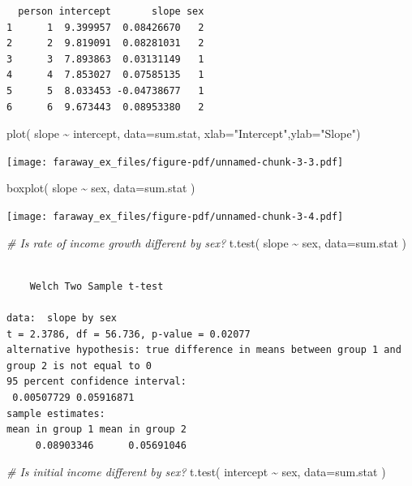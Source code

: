 \documentclass[
  letterpaper,
  DIV=11,
  numbers=noendperiod]{scrreprt}
\newenvironment{Shaded}{}{}
\newcommand{\AttributeTok}[1]{\textcolor[rgb]{0.49,0.56,0.16}{#1}}
\newcommand{\CommentTok}[1]{\textcolor[rgb]{0.38,0.63,0.69}{\textit{#1}}}
\newcommand{\FunctionTok}[1]{\textcolor[rgb]{0.02,0.16,0.49}{#1}}
\newcommand{\NormalTok}[1]{#1}
\newcommand{\SpecialCharTok}[1]{\textcolor[rgb]{0.25,0.44,0.63}{#1}}
\newcommand{\StringTok}[1]{\textcolor[rgb]{0.25,0.44,0.63}{#1}}
\begin{document}
\begin{verbatim}
  person intercept       slope sex
1      1  9.399957  0.08426670   2
2      2  9.819091  0.08281031   2
3      3  7.893863  0.03131149   1
4      4  7.853027  0.07585135   1
5      5  8.033453 -0.04738677   1
6      6  9.673443  0.08953380   2
\end{verbatim}

\begin{Shaded}
\begin{Highlighting}[]
\FunctionTok{plot}\NormalTok{( slope }\SpecialCharTok{\textasciitilde{}}\NormalTok{ intercept, }\AttributeTok{data=}\NormalTok{sum.stat, }\AttributeTok{xlab=}\StringTok{"Intercept"}\NormalTok{,}\AttributeTok{ylab=}\StringTok{"Slope"}\NormalTok{)}
\end{Highlighting}
\end{Shaded}

\texttt{[image: faraway\_ex\_files/figure-pdf/unnamed-chunk-3-3.pdf]}

\begin{Shaded}
\begin{Highlighting}[]
\FunctionTok{boxplot}\NormalTok{( slope }\SpecialCharTok{\textasciitilde{}}\NormalTok{ sex, }\AttributeTok{data=}\NormalTok{sum.stat )}
\end{Highlighting}
\end{Shaded}

\texttt{[image: faraway\_ex\_files/figure-pdf/unnamed-chunk-3-4.pdf]}

\begin{Shaded}
\begin{Highlighting}[]
\CommentTok{\# Is rate of income growth different by sex?}
\FunctionTok{t.test}\NormalTok{( slope }\SpecialCharTok{\textasciitilde{}}\NormalTok{ sex, }\AttributeTok{data=}\NormalTok{sum.stat )}
\end{Highlighting}
\end{Shaded}

\begin{verbatim}

    Welch Two Sample t-test

data:  slope by sex
t = 2.3786, df = 56.736, p-value = 0.02077
alternative hypothesis: true difference in means between group 1 and group 2 is not equal to 0
95 percent confidence interval:
 0.00507729 0.05916871
sample estimates:
mean in group 1 mean in group 2 
     0.08903346      0.05691046 
\end{verbatim}

\begin{Shaded}
\begin{Highlighting}[]
\CommentTok{\# Is initial income different by sex?}
\FunctionTok{t.test}\NormalTok{( intercept }\SpecialCharTok{\textasciitilde{}}\NormalTok{ sex, }\AttributeTok{data=}\NormalTok{sum.stat )}
\end{Highlighting}
\end{Shaded}
\end{document}
